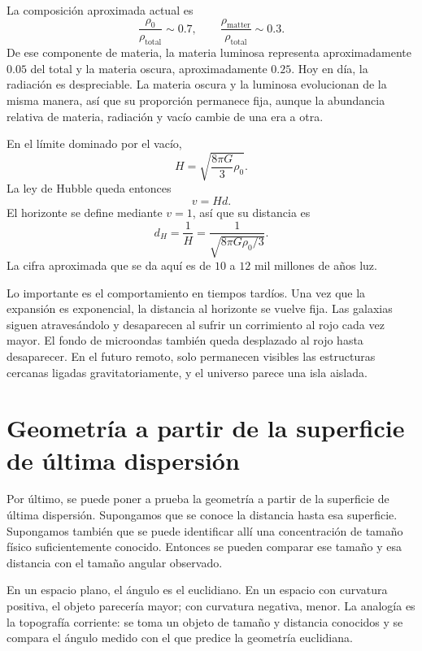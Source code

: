La composición aproximada actual es
\begin{equation}
\frac{\rho_0}{\rho_{\text{total}}}\sim 0.7,
\qquad
\frac{\rho_{\text{matter}}}{\rho_{\text{total}}}\sim 0.3.
\end{equation}
De ese componente de materia, la materia luminosa representa aproximadamente \(0.05\) del total y la materia oscura, aproximadamente \(0.25\). Hoy en día, la radiación es despreciable. La materia oscura y la luminosa evolucionan de la misma manera, así que su proporción permanece fija, aunque la abundancia relativa de materia, radiación y vacío cambie de una era a otra.

En el límite dominado por el vacío,
\begin{equation}
H=\sqrt{\frac{8\pi G}{3}\rho_0}.
\end{equation}
La ley de Hubble queda entonces
\begin{equation}
v=Hd.
\end{equation}
El horizonte se define mediante \(v=1\), así que su distancia es
\begin{equation}
d_H=\frac{1}{H}
=
\frac{1}{\sqrt{8\pi G\rho_0/3}}.
\end{equation}
La cifra aproximada que se da aquí es de \(10\) a \(12\) mil millones de años luz.

Lo importante es el comportamiento en tiempos tardíos. Una vez que la expansión es exponencial, la distancia al horizonte se vuelve fija. Las galaxias siguen atravesándolo y desaparecen al sufrir un corrimiento al rojo cada vez mayor. El fondo de microondas también queda desplazado al rojo hasta desaparecer. En el futuro remoto, solo permanecen visibles las estructuras cercanas ligadas gravitatoriamente, y el universo parece una isla aislada.

\section{Geometría a partir de la superficie de última dispersión}

Por último, se puede poner a prueba la geometría a partir de la superficie de última dispersión. Supongamos que se conoce la distancia hasta esa superficie. Supongamos también que se puede identificar allí una concentración de tamaño físico suficientemente conocido. Entonces se pueden comparar ese tamaño y esa distancia con el tamaño angular observado.

En un espacio plano, el ángulo es el euclidiano. En un espacio con curvatura positiva, el objeto parecería mayor; con curvatura negativa, menor. La analogía es la topografía corriente: se toma un objeto de tamaño y distancia conocidos y se compara el ángulo medido con el que predice la geometría euclidiana.

